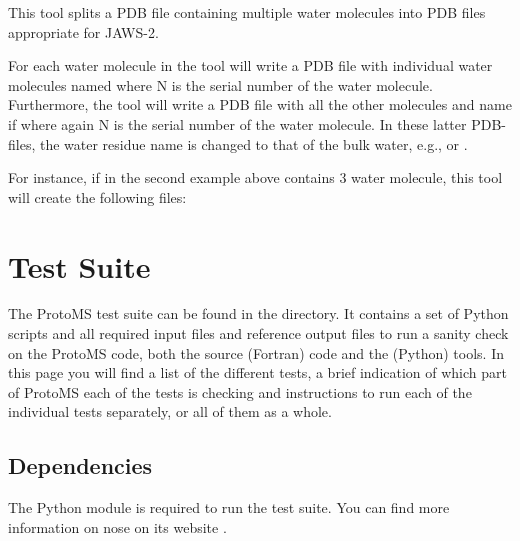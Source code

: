 \documentclass[letterpaper,10pt,english]{sphinxmanual}
\begin{document}
This tool splits a PDB file containing multiple water molecules into PDB files appropriate for JAWS-2.

For each water molecule in  the tool will write a PDB file with individual water molecules named  where N is the serial number of the water molecule. Furthermore, the tool will write a PDB file with all the other molecules and name if  where again N is the serial number of the water molecule. In these latter PDB-files, the water residue name is changed to that of the bulk water, e.g.,  or .

For instance, if  in the second example above contains 3 water molecule, this tool will create the following files:

%
\begin{sphinxVerbatim}[commandchars=\\\{\}]

\end{sphinxVerbatim}


\chapter{Test Suite}
\label{\detokenize{testsuite::doc}}\label{\detokenize{testsuite:test-suite}}
The ProtoMS test suite can be found in the  directory. It contains a set of Python scripts and all required input files and reference output files to run a sanity check on the ProtoMS code, both the source (Fortran) code and the (Python) tools. In this page you will find a list of the different tests, a brief indication of which part of ProtoMS each of the tests is checking and instructions to run each of the individual tests separately, or all of them as a whole.


\section{Dependencies}
\label{\detokenize{testsuite:dependencies}}
The Python module  is required to run the test suite. You can find more information on nose on its website .
\end{document}
